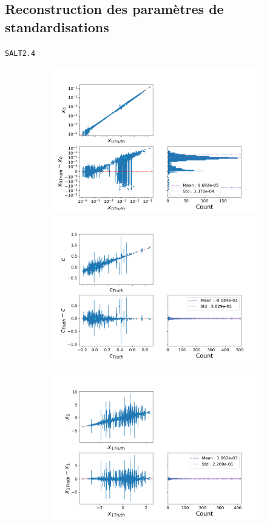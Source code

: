 \documentclass{beamer}
\begin{document}
\subsection{Reconstruction des paramètres de standardisations}

\begin{frame}{\texttt{SALT2.4}}
\begin{figure}
	\begin{subfigure}{0.49\textwidth}
		\centering
		\includegraphics[width=.8\textwidth]{figures/salt_x0.png}
		\includegraphics[width=.8\textwidth]{figures/salt_c.png}
	\end{subfigure}
	\begin{subfigure}{0.49\textwidth}
		\centering
		\includegraphics[width=.8\textwidth]{figures/salt_x1.png}

\end{subfigure}
\end{figure}
\end{frame}
\end{document}
